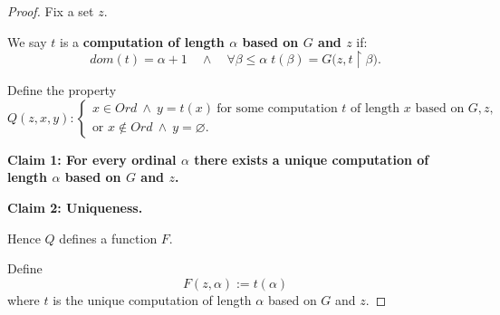 \documentclass[10pt,a4paper]{book}
\let\emptyset\varnothing
\begin{document}
\begin{proof}

    Fix a set $z$.

    We say $t$ is a \textbf{computation of length $\alpha$ based on $G$ and $z$}
    if:
    \[
        dom(t)=\alpha+1
        \quad\land\quad
        \forall \beta\le \alpha\; t(\beta)=G\bigl(z, t\upharpoonright \beta\bigr).
    \]

    Define the property
    \[
        Q(z,x,y):
        \begin{cases}
            x\in Ord \ \land\ y=t(x)\ \text{for some computation } t \text{ of length } x \text{ based on } G,z, \\
            \text{or } x\notin Ord \ \land\ y=\emptyset.
        \end{cases}
    \]

    \textbf{Claim 1: For every ordinal $\alpha$ there exists a unique computation of length $\alpha$ based on $G$ and $z$.}

    \begin{fitchproof}[arrayenv=tabular]


         


         



    \end{fitchproof}

    \textbf{Claim 2: Uniqueness.}

    \begin{fitchproof}[arrayenv=tabular]


    \end{fitchproof}

    Hence $Q$ defines a function $F$.

    Define
    \[
        F(z,\alpha):=t(\alpha)
    \]
    where $t$ is the unique computation of length $\alpha$ based on $G$ and $z$.


\end{proof}
\end{document}
